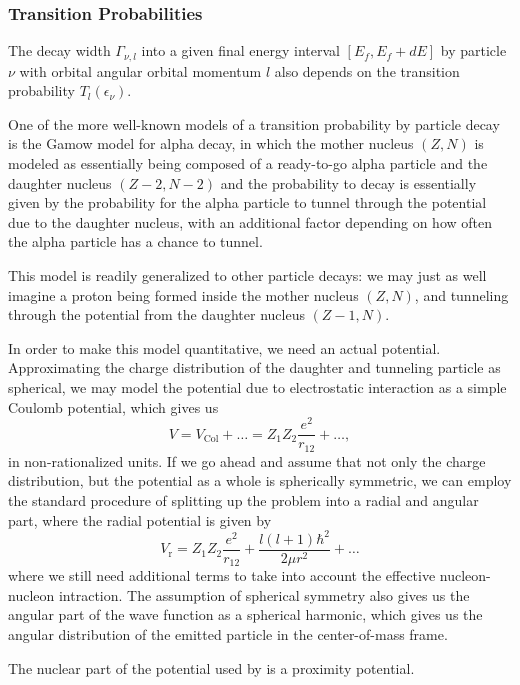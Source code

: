 \subsubsection{Transition Probabilities}
The decay width $\Gamma_{\nu,l}$ into a given final energy interval $[E_f,E_f+dE]$ by particle $\nu$ with orbital angular orbital momentum $l$ also depends on the transition probability $T_l(\epsilon_\nu)$.

One of the more well-known models of a transition probability by particle decay is the Gamow model for alpha decay, in which the mother nucleus $(Z,N)$ is modeled as essentially being composed of a ready-to-go alpha particle and the daughter nucleus $(Z-2,N-2)$ and the probability to decay is essentially given by the probability for the alpha particle to tunnel through the potential due to the daughter nucleus, with an additional factor depending on how often the alpha particle has a chance to tunnel. 

This model is readily generalized to other particle decays: we may just as well imagine a proton being formed inside the mother nucleus $(Z,N)$, and tunneling through the potential from the daughter nucleus $(Z-1,N)$.

In order to make this model quantitative, we need an actual potential. Approximating the charge distribution of the daughter and tunneling particle as spherical, we may model the potential due to electrostatic interaction as a simple Coulomb potential, which gives us
\begin{equation}
V = V_\text{Col} + \dots =  Z_1 Z_2 \frac{e^2}{r_{12}} + \dots,
\end{equation}
in non-rationalized units.
If we go ahead and assume that not only the charge distribution, but the potential as a whole is spherically symmetric, we can employ the standard procedure of splitting up the problem into a radial and angular part, where the radial potential is given by
\begin{equation}
V_\text{r} = Z_1 Z_2 \frac{e^2}{r_{12}} + \frac{l(l+1)\hbar^2}{2\mu r^2} + \dots
\end{equation}
where we still need additional terms to take into account the effective nucleon-nucleon intraction. The assumption of spherical symmetry also gives us the angular part of the wave function as a spherical harmonic, which gives us the angular distribution of the emitted particle in the center-of-mass frame.

The nuclear part of the potential used by  is a proximity potential\cite{gollerthan:1988:thesis}\cite{blocki1977}. 

